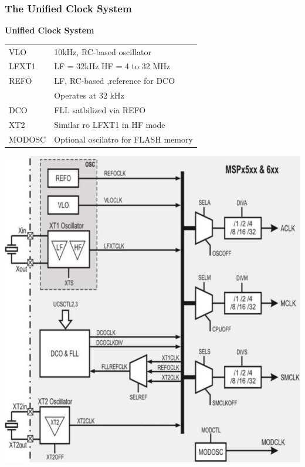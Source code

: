 \subsubsection{The Unified Clock System }
\begin{minipage}{0.585\linewidth}
    \textbf{Unified Clock System}\newline
    \begin{tabular}{ll}
       VLO      & 10kHz, RC-based oscillator    \\
       LFXT1    & LF = 32kHz HF = 4 to 32 MHz   \\
       REFO     & LF, RC-based ,reference for DCO\\
                & Operates at 32 kHz\\
       DCO      & FLL satbilized via REFO \\
       XT2      & Similar ro LFXT1 in HF mode\\
       MODOSC   & Optional oscilatro for FLASH memory\\
    \end{tabular}
\end{minipage}
\begin{minipage}{0.41\linewidth}
    \includegraphics[width=0.85\linewidth]{images/UnifiedClock} 
\end{minipage}


